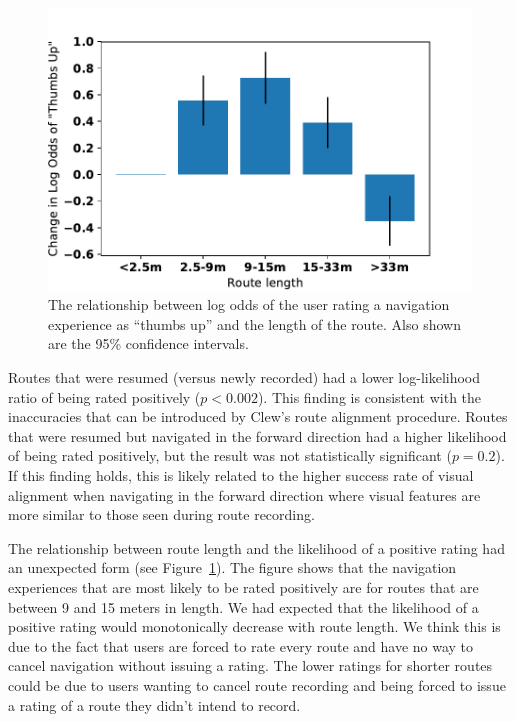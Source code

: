 \documentclass[chi_draft]{sigchi}
\begin{document}
\begin{figure}
\includegraphics[width=\linewidth]{figures/routelength}
\caption{The relationship between log odds of the user rating a navigation experience as ``thumbs up'' and the length of the route.  Also shown are the 95\% confidence intervals.\label{fig:routelength}}
\end{figure}

Routes that were resumed (versus newly recorded) had a lower log-likelihood ratio of being rated positively ($p < 0.002$).  This finding is consistent with the inaccuracies that can be introduced by Clew's route alignment procedure.  Routes that were resumed but navigated in the forward direction had a higher likelihood of being rated positively, but the result was not statistically significant ($p = 0.2$). If this finding holds, this is likely related to the higher success rate of visual alignment when navigating in the forward direction where visual features are more similar to those seen during route recording.


The relationship between route length and the likelihood of a positive rating had an unexpected form (see Figure~\ref{fig:routelength}).  The figure shows that the navigation experiences that are most likely to be rated positively are for routes that are between 9 and 15 meters in length. We had expected that the likelihood of a positive rating would monotonically decrease with route length.  We think this is due to the fact that users are forced to rate every route and have no way to cancel navigation without issuing a rating.  The lower ratings for shorter routes could be due to users wanting to cancel route recording and being forced to issue a rating of a route they didn't intend to record.
\end{document}
